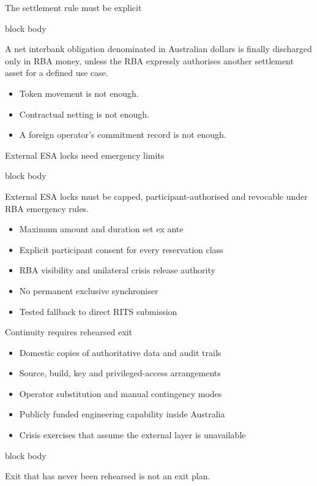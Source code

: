 \documentclass[aspectratio=169,12pt]{beamer}
\newcommand{\tightitems}{\setlength{\itemsep}{0.42em}\setlength{\parskip}{0pt}}
\newenvironment{statement}{%
  \begin{beamercolorbox}[sep=.18cm,rounded=false,wd=\linewidth]{block body}%
  \fontsize{13}{15.5}\selectfont\bfseries
}{\end{beamercolorbox}}
\begin{document}
\begin{frame}{The settlement rule must be explicit}
  \begin{statement}
    A net interbank obligation denominated in Australian dollars is finally discharged only in RBA money, unless the RBA expressly authorises another settlement asset for a defined use case.
  \end{statement}
  \vspace{0.42cm}
  \begin{itemize}\tightitems
    \item Token movement is not enough.
    \item Contractual netting is not enough.
    \item A foreign operator's commitment record is not enough.
  \end{itemize}
\end{frame}

\begin{frame}{External ESA locks need emergency limits}
  \begin{statement}
    External ESA locks must be capped, participant-authorised and revocable under RBA emergency rules.
  \end{statement}
  \vspace{0.42cm}
  \begin{itemize}\tightitems
    \item Maximum amount and duration set ex ante
    \item Explicit participant consent for every reservation class
    \item RBA visibility and unilateral crisis release authority
    \item No permanent exclusive synchroniser
    \item Tested fallback to direct RITS submission
  \end{itemize}
\end{frame}

\begin{frame}{Continuity requires rehearsed exit}
  \begin{itemize}\tightitems
    \item Domestic copies of authoritative data and audit trails
    \item Source, build, key and privileged-access arrangements
    \item Operator substitution and manual contingency modes
    \item Publicly funded engineering capability inside Australia
    \item Crisis exercises that assume the external layer is unavailable
  \end{itemize}
  \begin{statement}
    Exit that has never been rehearsed is not an exit plan.
  \end{statement}
\end{frame}
\end{document}
